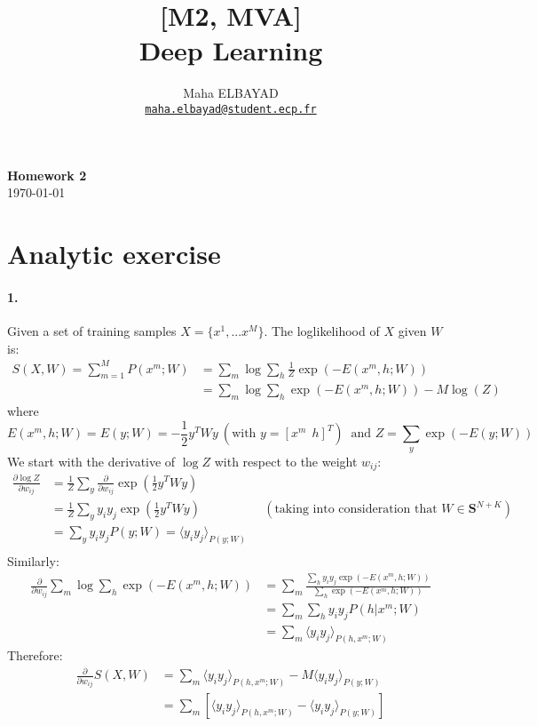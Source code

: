 \documentclass[11pt]{article}
\title{[M2, MVA]\\ Deep Learning}
\author{Maha ELBAYAD\\ \href{mailto:maha.elbayad@student.ecp.fr}{\tt maha.elbayad@student.ecp.fr}}
\date{}
\theoremstyle{exo}
\newcommand{\1}{\mathbbm{1}}
\begin{document}
\maketitle
\vspace{-10pt}
\begin{center}
{\huge \bf Homework 2}\\
\today
\vspace{10pt}
\end{center}

\vspace{7pt}

\section{Analytic exercise}
	\paragraph{1.}
		Given a set of training samples $X=\{x^1,...x^M\}$. The loglikelihood of $X$ given $W$ is:
		\[\begin{split}
		S(X,W)=\sum_{m=1}^MP(x^m;W)&=\sum_m\log\sum_h\frac{1}{Z}\exp(-E(x^m,h;W))\\
		&=\sum_m\log\sum_h\exp(-E(x^m,h;W))-M\log(Z)
		\end{split}\]
		where
		\[E(x^m,h;W)=E(y;W)=-\frac{1}{2}y^TWy\:(\text{with }y=[x^m\:\:h]^T)\:\text{ and }Z=\sum_y\exp(-E(y;W))\]
		We start with the derivative of $\log Z$ with respect to the weight $w_{ij}$:
		\[\begin{split}
		\frac{\partial \log Z}{\partial w_{ij}}&=\frac{1}{Z}\sum_y\frac{\partial}{\partial w_{ij}}\exp(\frac{1}{2}y^TWy)\\
		&=\frac{1}{Z}\sum_yy_iy_j\exp(\frac{1}{2}y^TWy)\phantom{abcdefghikl}(\text{taking into consideration that } W\in\mathbf{S}^{N+K})\\
		&=\sum_yy_iy_jP(y;W)=\langle y_iy_j\rangle_{P(y;W)}\\
		\end{split}\]
		Similarly:
		\[\begin{split}
		\frac{\partial}{\partial w_{ij}}\sum_m\log\sum_h\exp(-E(x^m,h;W))&=\sum_m\frac{\sum_hy_iy_j\exp(-E(x^m,h;W))}{\sum_h\exp(-E(x^m,h;W))}\\
		&=\sum_m\sum_hy_iy_jP(h|x^m;W)\\
		&=\sum_m\langle y_iy_j\rangle_{P(h,x^m;W)}
		\end{split}\]
		Therefore:
		\[\begin{split}
		\frac{\partial}{\partial w_{ij}}S(X,W)&=\sum_m\langle y_iy_j\rangle_{P(h,x^m;W)}-M\langle y_iy_j\rangle_{P(y;W)}\\
		&=\sum_m\left[\langle y_iy_j\rangle_{P(h,x^m;W)}-\langle y_iy_j\rangle_{P(y;W)}\right]
		\end{split}\]
\end{document}
